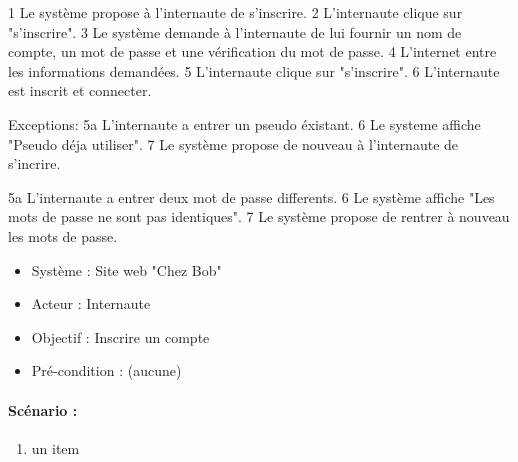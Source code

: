 1 Le système propose à l'internaute de s'inscrire.
2 L'internaute clique sur "s'inscrire".
3 Le système demande à l'internaute de lui fournir un nom de compte, un mot de passe et une vérification du mot de passe.
4 L'internet entre les informations demandées.
5 L'internaute clique sur "s'inscrire".
6 L'internaute est inscrit et connecter.

Exceptions: 
			5a L'internaute a entrer un pseudo éxistant.
			6 Le systeme affiche "Pseudo déja utiliser".
			7 Le système propose de nouveau à l'internaute de s'incrire.
			
			5a L'internaute a entrer deux mot de passe differents.
			6 Le système affiche "Les mots de passe ne sont pas identiques".
			7 Le système propose de rentrer à nouveau les mots de passe.

\begin{boxedminipage}[t]{12cm}
	\begin{itemize}
		\item Système : Site web "Chez Bob"
		\item Acteur : Internaute
		\item Objectif : Inscrire un compte
		\item Pré-condition : (aucune)
	\end{itemize}

	\renewcommand\theenumi{\arabic{enumi}}
	\renewcommand\labelenumi{\theenumi .}
	\renewcommand\theenumii{\Alph{enumii}}
	\renewcommand\labelenumii{(\theenumii)}
	\paragraph{Scénario :} 
	\begin{enumerate}
		\item \label{sc1l1} un item
	\end{enumerate}
\end{boxedminipage}
\newpage

